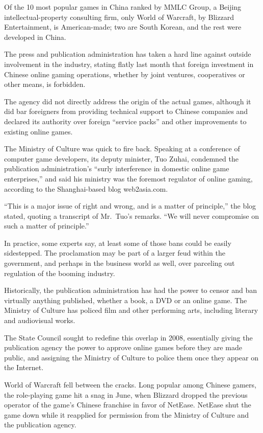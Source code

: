 ﻿\documentclass[12pt]{article}
\begin{document}
Of the 10 most popular games in China ranked by MMLC Group, a Beijing intellectual-property
consulting firm, only World of Warcraft, by Blizzard Entertainment, is American-made; two are South
Korean, and the rest were developed in China.

The press and publication administration has taken a hard line against outside involvement in the
industry, stating flatly last month that foreign investment in Chinese online gaming operations,
whether by joint ventures, cooperatives or other means, is forbidden.

The agency did not directly address the origin of the actual games, although it did bar foreigners
from providing technical support to Chinese companies and declared its authority over foreign
``service packs'' and other improvements to existing online games.

The Ministry of Culture was quick to fire back. Speaking at a conference of computer game
developers, its deputy minister, Tuo Zuhai, condemned the publication administration's ``surly
interference in domestic online game enterprises,'' and said his ministry was the foremost regulator
of online gaming, according to the Shanghai-based blog web2asia.com.

``This is a major issue of right and wrong, and is a matter of principle,'' the blog stated, quoting
a transcript of Mr.~Tuo's remarks. ``We will never compromise on such a matter of principle.''

In practice, some experts say, at least some of those bans could be easily sidestepped. The
proclamation may be part of a larger feud within the government, and perhaps in the business world
as well, over parceling out regulation of the booming industry.

Historically, the publication administration has had the power to censor and ban virtually anything
published, whether a book, a DVD or an online game. The Ministry of Culture has policed film and
other performing arts, including literary and audiovisual works.

The State Council sought to redefine this overlap in 2008, essentially giving the publication agency
the power to approve online games before they are made public, and assigning the Ministry of Culture
to police them once they appear on the Internet.

World of Warcraft fell between the cracks. Long popular among Chinese gamers, the role-playing game
hit a snag in June, when Blizzard dropped the previous operator of the game's Chinese franchise in
favor of NetEase. NetEase shut the game down while it reapplied for permission from the Ministry of
Culture and the publication agency.
\end{document}
